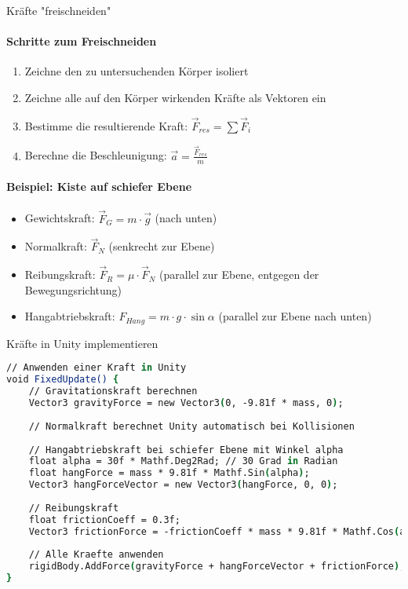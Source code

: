 \begin{KR}{Kräfte "freischneiden"}\\
    \paragraph{Schritte zum Freischneiden}
    \begin{enumerate}
        \item Zeichne den zu untersuchenden Körper isoliert
        \item Zeichne alle auf den Körper wirkenden Kräfte als Vektoren ein
        \item Bestimme die resultierende Kraft: $\vec{F}_{res} = \sum \vec{F}_i$
        \item Berechne die Beschleunigung: $\vec{a} = \frac{\vec{F}_{res}}{m}$
    \end{enumerate}
    
    \paragraph{Beispiel: Kiste auf schiefer Ebene}
    \begin{itemize}
        \item Gewichtskraft: $\vec{F}_G = m \cdot \vec{g}$ (nach unten)
        \item Normalkraft: $\vec{F}_N$ (senkrecht zur Ebene)
        \item Reibungskraft: $\vec{F}_R = \mu \cdot \vec{F}_N$ (parallel zur Ebene, entgegen der Bewegungsrichtung)
        \item Hangabtriebskraft: $F_{Hang} = m \cdot g \cdot \sin\alpha$ (parallel zur Ebene nach unten)
    \end{itemize}
\end{KR}

\begin{examplecode}{Kräfte in Unity implementieren}\\
    \begin{lstlisting}[language=csh, style=basesmol]
// Anwenden einer Kraft in Unity
void FixedUpdate() {
    // Gravitationskraft berechnen
    Vector3 gravityForce = new Vector3(0, -9.81f * mass, 0);
    
    // Normalkraft berechnet Unity automatisch bei Kollisionen
    
    // Hangabtriebskraft bei schiefer Ebene mit Winkel alpha
    float alpha = 30f * Mathf.Deg2Rad; // 30 Grad in Radian
    float hangForce = mass * 9.81f * Mathf.Sin(alpha);
    Vector3 hangForceVector = new Vector3(hangForce, 0, 0);
    
    // Reibungskraft
    float frictionCoeff = 0.3f;
    Vector3 frictionForce = -frictionCoeff * mass * 9.81f * Mathf.Cos(alpha) * rigidBody.velocity.normalized;
    
    // Alle Kraefte anwenden
    rigidBody.AddForce(gravityForce + hangForceVector + frictionForce);
}
    \end{lstlisting}
\end{examplecode}

